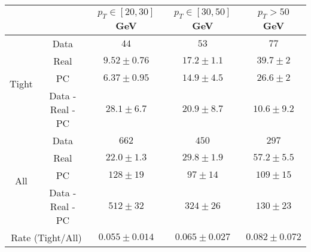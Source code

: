 \small
\begin{tabular}{|c|c||c|c|c|}
\hline
\multicolumn{2}{|c||}{} & $p_{T}\in[20,30]$ GeV & $p_{T}\in[30,50]$ GeV & $p_{T} > 50$ GeV\\ 
\hline
\hline
\multirow{4}{*}{Tight} & Data  &  $44$ &  $53$ &  $77$\\ 
&Real&   $9.52 \pm 0.76$ &  $17.2 \pm 1.1$ &  $39.7 \pm 2$\\ 
&PC &  $6.37 \pm 0.95$ &  $14.9 \pm 4.5$ &  $26.6 \pm 2$\\ 
\cline{2-5}
&Data - Real - PC &  $28.1 \pm 6.7$ &  $20.9 \pm 8.7$ &  $10.6 \pm 9.2$\\ 
\hline
\hline
\multirow{4}{*}{All} & Data  &  $662$ &  $450$ &  $297$\\ 
&Real&  $22.0 \pm 1.3$ &  $29.8 \pm 1.9$ &  $57.2 \pm 5.5$\\ 
&PC &  $128 \pm 19$ &  $ 97 \pm 14$ &  $109 \pm 15$\\ 
\cline{2-5}
&Data - Real - PC &  $512 \pm 32$ &  $324 \pm 26$ &  $130 \pm 23$\\ 
\hline
\hline
\multicolumn{2}{|c||}{Rate (Tight/All)} &  $0.055 \pm 0.014$ &  $0.065 \pm 0.027$ &  $0.082 \pm 0.072$\\ 
\hline
\end{tabular}
